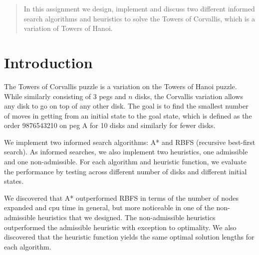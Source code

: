 \documentclass[12pt]{article}
\begin{document}
\maketitle

\begin{abstract}
In this assignment we design, implement and discuss two different informed search algorithms and heuristics to solve the Towers of Corvallis, which is a variation of Towers of Hanoi. 
\end{abstract}

\section{Introduction}

The Towers of Corvallis puzzle is a variation on the Towers of Hanoi puzzle. While similarly consisting of 3 pegs and $n$ disks, the Corvallis variation allows any disk to go on top of any other disk. The goal is to find the smallest number of moves in getting from an initial state to the goal state, which is defined as the order 9876543210 on peg A for 10 disks and similarly for fewer disks.

We implement two informed search algorithms: A* and RBFS (recursive best-first search). As informed searches, we also implement two heuristics, one admissible and one non-admissible. For each algorithm and heuristic function, we evaluate the performance by testing across different number of disks and different initial states.

We discovered that A* outperformed RBFS in terms of the number of nodes expanded and cpu time in general, but more noticeable in one of the non-admissible heuristics that we designed. The non-admissible heuristics outperformed the admissible heuristic with exception to optimality. We also discovered that the heuristic function yields the same optimal solution lengths for each algorithm.








\end{document}
